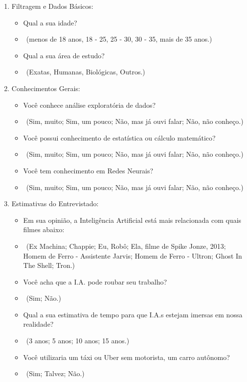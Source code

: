 \documentclass[onecolumn,12pt]{asme2ej}
\begin{document}
\begin{enumerate}

   \item Filtragem e Dados Básicos:
   \begin{itemize}
     \item[$*$] Qual a sua idade?
     \item[$-$]$\ \ $(menos de 18 anos, 18 - 25, 25 - 30, 30 - 35, mais de 35 anos.)
     \item[$*$] Qual a sua área de estudo?
     \item[$-$]$\ \ $(Exatas, Humanas, Biológicas, Outros.)
   \end{itemize}
   
   \item Conhecimentos Gerais:
   \begin{itemize}
     \item[$*$] Você conhece análise exploratória de dados?
     \item[$-$]$\ \ $(Sim, muito; Sim, um pouco; Não, mas já ouvi falar; Não, não conheço.)
     \item[$*$] Você possui conhecimento de estatística ou cálculo matemático?
     \item[$-$]$\ \ $(Sim, muito; Sim, um pouco; Não, mas já ouvi falar; Não, não conheço.)
     \item[$*$] Você tem conhecimento em Redes Neurais?
     \item[$-$]$\ \ $(Sim, muito; Sim, um pouco; Não, mas já ouvi falar; Não, não conheço.)
   \end{itemize}
    
   \item Estimativas do Entrevistado:
   \begin{itemize}
     \item[$*$] Em sua opinião, a Inteligência Artificial está mais relacionada com quais filmes abaixo:
     \item[$-$]$\ \ $(Ex Machina; Chappie; Eu, Robô; Ela, filme de Spike Jonze, 2013; Homem de Ferro - Assistente Jarvis; Homem de Ferro - Ultron; Ghost In The Shell; Tron.)
     \item[$*$] Você acha que a I.A. pode roubar seu trabalho?
     \item[$-$]$\ \ $(Sim; Não.)
     \item[$*$] Qual a sua estimativa de tempo para que I.A.s estejam imersas em nossa realidade?
     \item[$-$]$\ \ $(3 anos; 5 anos; 10 anos; 15 anos.)
     \item[$*$] Você utilizaria um táxi ou Uber sem motorista, um carro autônomo?
     \item[$-$]$\ \ $(Sim; Talvez; Não.)
   \end{itemize}
  

\end{enumerate}
\end{document}
